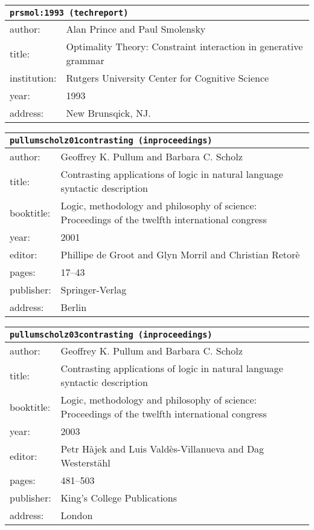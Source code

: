\documentclass{article}
\begin{document}
\bigskip

\begin{tabular}{p{}p{}}
\multicolumn{2}{l}{\texttt{prsmol:1993 (techreport)}}\\
\hline
author: & Alan Prince and Paul Smolensky\\
title: & Optimality Theory: Constraint interaction in generative grammar\\
institution: & Rutgers University Center for Cognitive Science\\
year: & 1993\\
address: & New Brunsqick, NJ.\\
\end{tabular}

\bigskip

\begin{tabular}{p{}p{}}
\multicolumn{2}{l}{\texttt{pullumscholz01contrasting (inproceedings)}}\\
\hline
author: & Geoffrey K. Pullum and Barbara C. Scholz\\
title: & Contrasting applications of logic in natural language syntactic description\\
booktitle: & Logic, methodology and philosophy of science: Proceedings of the twelfth international congress\\
year: & 2001\\
editor: & Phillipe {de Groot} and Glyn Morril and Christian Retor{\`e}\\
pages: & 17--43\\
publisher: & Springer-Verlag\\
address: & Berlin\\
\end{tabular}

\bigskip

\begin{tabular}{p{}p{}}
\multicolumn{2}{l}{\texttt{pullumscholz03contrasting (inproceedings)}}\\
\hline
author: & Geoffrey K. Pullum and Barbara C. Scholz\\
title: & Contrasting applications of logic in natural language syntactic description\\
booktitle: & Logic, methodology and philosophy of science: Proceedings of the twelfth international congress\\
year: & 2003\\
editor: & Petr H{\`a}jek and Luis Vald{\`e}s-Villanueva and Dag Westerst{\"a}hl\\
pages: & 481--503\\
publisher: & King's College Publications\\
address: & London\\
\end{tabular}
\end{document}
